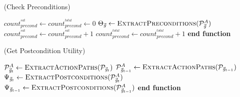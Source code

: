 \documentclass{article}
\begin{document}
\begin{algorithm}
	\caption{(Check Preconditions)}
	\label{array-sum}
	\begin{algorithmic}[1]
			\Statex
			\State $count_{precond}^{^{sat}} \gets count_{precond}^{^{total}} \gets 0$
			\Statex
			\State $\Theta_{\vec{\mathit{g}}} \gets
			\Call{ExtractPreconditions}{\mathcal{P}_{\vec{\mathit{g}}}^{A}}$
			\Statex
					\State $count_{precond}^{^{sat}} \gets count_{precond}^{^{sat}} + 1$
				\EndIf
				\State $count_{precond}^{^{total}} \gets count_{precond}^{^{total}} + 1$
			\EndFor
			\Statex
			\State {}
		\EndFunction 
	\State \textbf{end function}
	\end{algorithmic}
\end{algorithm}

\begin{algorithm}
	\caption{(Get Postcondition Utility)}
	\label{array-sum}
	\begin{algorithmic}[1]
			\Statex
			\State $\mathcal{P}_{\vec{\mathit{g}}_{t}}^A \gets \Call{ExtractActionPaths}
			{\mathcal{P}_{\vec{\mathit{g}}_{t}}}$
			\Statex
					\Statex 
					\State $\mathcal{P}_{\vec{\mathit{g}}_{t-1}}^A \gets \Call{ExtractActionPaths}
					{\mathcal{P}_{\vec{\mathit{g}}_{t-1}}}$
					\Statex
					\State $\Psi_{\vec{\mathit{g}}_t} \gets \Call{ExtractPostconditions}
					{\mathcal{P}_{\vec{\mathit{g}}_{t}}^A}$
					\State $\Psi_{\vec{\mathit{g}}_{t-1}} \gets \Call{ExtractPostconditions}
					{\mathcal{P}_{\vec{\mathit{g}}_{t-1}}^A}$
					\Statex
							\State {} 
						\Else
							\State {}
						\EndIf
					\Else
							\State {}
						\Else
							\State {}
						\EndIf
					\EndIf
				\EndIf
			\EndIf
		\EndFunction 
	\State \textbf{end function}
	\end{algorithmic}
\end{algorithm}
\end{document}
